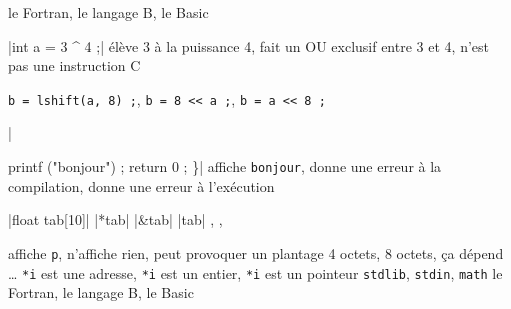 \begin{alterqcm}[lq=80mm,long] 

{{le Fortran},
 {le langage B},
 {le Basic}}

\verbdef\argprop|int a = 3 ^ 4 ;|
\AQquestion{\argprop}
{{élève 3 à la puissance 4},
 {fait un OU exclusif entre 3 et 4},
 {n'est pas une instruction C}}

%--------------------------------------------------------------
{{\texttt{b = lshift(a, 8) ;}},
 {\texttt{b = 8 << a ;}},
 {\texttt{b = a << 8 ;}}}

%--------------------------------------------------------------
\verbdef\argprop|{ printf ("bonjour") ; return 0 ; \}|
{{affiche \texttt{bonjour}},
 {donne une erreur à la compilation},
 {donne une erreur à l'exécution}}

\verbdef\arg|float tab[10]|
\verbdef\propa|*tab|\global\let\propa\propa
\verbdef\propb|&tab|\global\let\propb\propb
\verbdef\propc|tab|\global\let\propc\propc
{}
{{\propa},
 {\propb},
 {\propc}}

{{affiche \texttt{p}},
 {n'affiche rien},
 {peut provoquer un plantage}}
{{4 octets},
 {8 octets},
 {ça dépend \ldots}}
{{\texttt{*i} est une adresse},
 {\texttt{*i} est un entier},
 {\texttt{*i} est un pointeur}}
{{\texttt{stdlib}},
 {\texttt{stdin}},
 {\texttt{math}}}
 {{le Fortran},
  {le langage B},
  {le Basic}}

}
\end{alterqcm}
